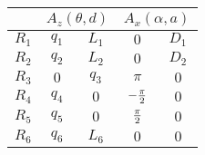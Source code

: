 \begin{tabular}{c|c|c|c|c|}
            \cline{2-5} &
            \multicolumn{2}{|c|}{$A_z(\theta,d)$} &
            \multicolumn{2}{|c|}{$A_x(\alpha,a)$} \\
            \hline
        \multicolumn{1}{|c|}{$R_1$} & $q_{1}$ & $L_{1}$ & $0$ & $D_{1}$ \\
            \hline
        \multicolumn{1}{|c|}{$R_2$} & $q_{2}$ & $L_{2}$ & $0$ & $D_{2}$ \\
            \hline
        \multicolumn{1}{|c|}{$R_3$} & $0$ & $q_{3}$ & $\pi$ & $0$ \\
            \hline
        \multicolumn{1}{|c|}{$R_4$} & $q_{4}$ & $0$ & $-{{\pi}\over{2}}$ & $0$ \\
            \hline
        \multicolumn{1}{|c|}{$R_5$} & $q_{5}$ & $0$ & ${{\pi}\over{2}}$ & $0$ \\
            \hline
        \multicolumn{1}{|c|}{$R_6$} & $q_{6}$ & $L_{6}$ & $0$ & $0$ \\
            \hline
\end{tabular}
